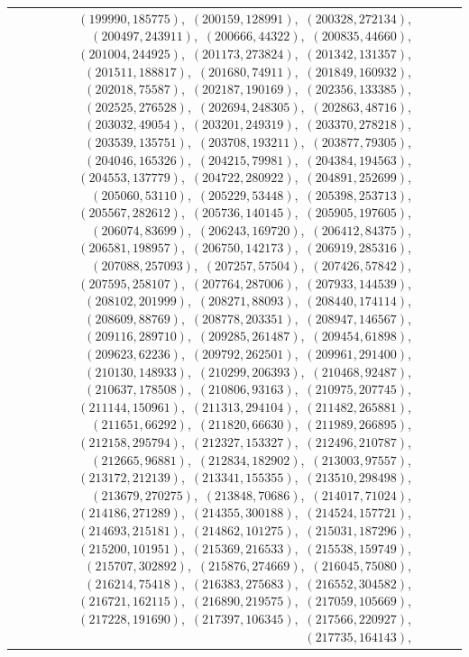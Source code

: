 \documentclass[11pt]{article}
\begin{document}
\begin{longtable}{@{}rrl>{\raggedright\arraybackslash}p{}@{}}
$(199990,185775)$,\allowbreak\ $(200159,128991)$,\allowbreak\ $(200328,272134)$,\allowbreak\ $(200497,243911)$,\allowbreak\ $(200666,44322)$,\allowbreak\ $(200835,44660)$,\allowbreak\ $(201004,244925)$,\allowbreak\ $(201173,273824)$,\allowbreak\ $(201342,131357)$,\allowbreak\ $(201511,188817)$,\allowbreak\ $(201680,74911)$,\allowbreak\ $(201849,160932)$,\allowbreak\ $(202018,75587)$,\allowbreak\ $(202187,190169)$,\allowbreak\ $(202356,133385)$,\allowbreak\ $(202525,276528)$,\allowbreak\ $(202694,248305)$,\allowbreak\ $(202863,48716)$,\allowbreak\ $(203032,49054)$,\allowbreak\ $(203201,249319)$,\allowbreak\ $(203370,278218)$,\allowbreak\ $(203539,135751)$,\allowbreak\ $(203708,193211)$,\allowbreak\ $(203877,79305)$,\allowbreak\ $(204046,165326)$,\allowbreak\ $(204215,79981)$,\allowbreak\ $(204384,194563)$,\allowbreak\ $(204553,137779)$,\allowbreak\ $(204722,280922)$,\allowbreak\ $(204891,252699)$,\allowbreak\ $(205060,53110)$,\allowbreak\ $(205229,53448)$,\allowbreak\ $(205398,253713)$,\allowbreak\ $(205567,282612)$,\allowbreak\ $(205736,140145)$,\allowbreak\ $(205905,197605)$,\allowbreak\ $(206074,83699)$,\allowbreak\ $(206243,169720)$,\allowbreak\ $(206412,84375)$,\allowbreak\ $(206581,198957)$,\allowbreak\ $(206750,142173)$,\allowbreak\ $(206919,285316)$,\allowbreak\ $(207088,257093)$,\allowbreak\ $(207257,57504)$,\allowbreak\ $(207426,57842)$,\allowbreak\ $(207595,258107)$,\allowbreak\ $(207764,287006)$,\allowbreak\ $(207933,144539)$,\allowbreak\ $(208102,201999)$,\allowbreak\ $(208271,88093)$,\allowbreak\ $(208440,174114)$,\allowbreak\ $(208609,88769)$,\allowbreak\ $(208778,203351)$,\allowbreak\ $(208947,146567)$,\allowbreak\ $(209116,289710)$,\allowbreak\ $(209285,261487)$,\allowbreak\ $(209454,61898)$,\allowbreak\ $(209623,62236)$,\allowbreak\ $(209792,262501)$,\allowbreak\ $(209961,291400)$,\allowbreak\ $(210130,148933)$,\allowbreak\ $(210299,206393)$,\allowbreak\ $(210468,92487)$,\allowbreak\ $(210637,178508)$,\allowbreak\ $(210806,93163)$,\allowbreak\ $(210975,207745)$,\allowbreak\ $(211144,150961)$,\allowbreak\ $(211313,294104)$,\allowbreak\ $(211482,265881)$,\allowbreak\ $(211651,66292)$,\allowbreak\ $(211820,66630)$,\allowbreak\ $(211989,266895)$,\allowbreak\ $(212158,295794)$,\allowbreak\ $(212327,153327)$,\allowbreak\ $(212496,210787)$,\allowbreak\ $(212665,96881)$,\allowbreak\ $(212834,182902)$,\allowbreak\ $(213003,97557)$,\allowbreak\ $(213172,212139)$,\allowbreak\ $(213341,155355)$,\allowbreak\ $(213510,298498)$,\allowbreak\ $(213679,270275)$,\allowbreak\ $(213848,70686)$,\allowbreak\ $(214017,71024)$,\allowbreak\ $(214186,271289)$,\allowbreak\ $(214355,300188)$,\allowbreak\ $(214524,157721)$,\allowbreak\ $(214693,215181)$,\allowbreak\ $(214862,101275)$,\allowbreak\ $(215031,187296)$,\allowbreak\ $(215200,101951)$,\allowbreak\ $(215369,216533)$,\allowbreak\ $(215538,159749)$,\allowbreak\ $(215707,302892)$,\allowbreak\ $(215876,274669)$,\allowbreak\ $(216045,75080)$,\allowbreak\ $(216214,75418)$,\allowbreak\ $(216383,275683)$,\allowbreak\ $(216552,304582)$,\allowbreak\ $(216721,162115)$,\allowbreak\ $(216890,219575)$,\allowbreak\ $(217059,105669)$,\allowbreak\ $(217228,191690)$,\allowbreak\ $(217397,106345)$,\allowbreak\ $(217566,220927)$,\allowbreak\ $(217735,164143)$,\allowbreak\ 
\end{longtable}
\end{document}
